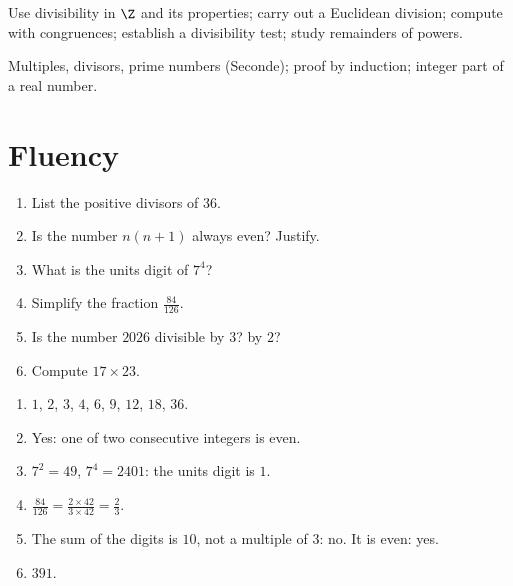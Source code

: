
\begin{objectives}
Use divisibility in $\Z$ and its properties; carry out a Euclidean division; compute with congruences; establish a divisibility test; study remainders of powers.
\end{objectives}
\begin{prerequisites}
Multiples, divisors, prime numbers (Seconde); proof by induction; integer part of a real number.
\end{prerequisites}

\section{Fluency}
\begin{fluency}
\begin{enumerate}
\item List the positive divisors of $36$.
\item Is the number $n(n+1)$ always even? Justify.
\item What is the units digit of $7^4$?
\item Simplify the fraction $\frac{84}{126}$.
\item Is the number $\num{2026}$ divisible by $3$? by $2$?
\item Compute $17\times23$.
\end{enumerate}
\end{fluency}
\begin{solution}[Fluency]
\begin{enumerate}
\item $1$, $2$, $3$, $4$, $6$, $9$, $12$, $18$, $36$.
\item Yes: one of two consecutive integers is even.
\item $7^2=49$, $7^4=\num{2401}$: the units digit is $1$.
\item $\frac{84}{126}=\frac{2\times42}{3\times42}=\frac23$.
\item The sum of the digits is $10$, not a multiple of $3$: no. It is even: yes.
\item $391$.
\end{enumerate}
\end{solution}

\mxnewpage
